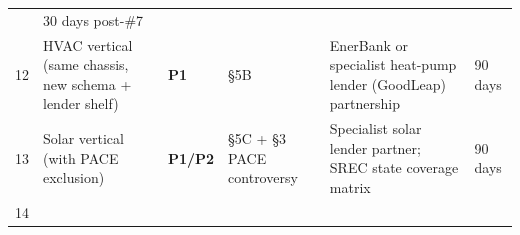 \documentclass[
  10pt,
]{article}
\begin{document}
\begin{longtable}[]{@{}llllll@{}}
\begin{minipage}[t]{0.14\columnwidth}
\end{minipage} & \begin{minipage}[t]{0.14\columnwidth}\raggedright
30 days post-\#7\strut
\end{minipage}\tabularnewline
\begin{minipage}[t]{0.14\columnwidth}\raggedright
12\strut
\end{minipage} & \begin{minipage}[t]{0.14\columnwidth}\raggedright
HVAC vertical (same chassis, new schema + lender shelf)\strut
\end{minipage} & \begin{minipage}[t]{0.14\columnwidth}\raggedright
\textbf{P1}\strut
\end{minipage} & \begin{minipage}[t]{0.14\columnwidth}\raggedright
§5B\strut
\end{minipage} & \begin{minipage}[t]{0.14\columnwidth}\raggedright
EnerBank or specialist heat-pump lender (GoodLeap) partnership\strut
\end{minipage} & \begin{minipage}[t]{0.14\columnwidth}\raggedright
90 days\strut
\end{minipage}\tabularnewline
\begin{minipage}[t]{0.14\columnwidth}\raggedright
13\strut
\end{minipage} & \begin{minipage}[t]{0.14\columnwidth}\raggedright
Solar vertical (with PACE exclusion)\strut
\end{minipage} & \begin{minipage}[t]{0.14\columnwidth}\raggedright
\textbf{P1/P2}\strut
\end{minipage} & \begin{minipage}[t]{0.14\columnwidth}\raggedright
§5C + §3 PACE controversy\strut
\end{minipage} & \begin{minipage}[t]{0.14\columnwidth}\raggedright
Specialist solar lender partner; SREC state coverage matrix\strut
\end{minipage} & \begin{minipage}[t]{0.14\columnwidth}\raggedright
90 days\strut
\end{minipage}\tabularnewline
\begin{minipage}[t]{0.14\columnwidth}\raggedright
14\strut
\end{minipage} & \begin{minipage}[t]{0.14\columnwidth}\raggedright

\end{minipage}
\end{longtable}
\end{document}
